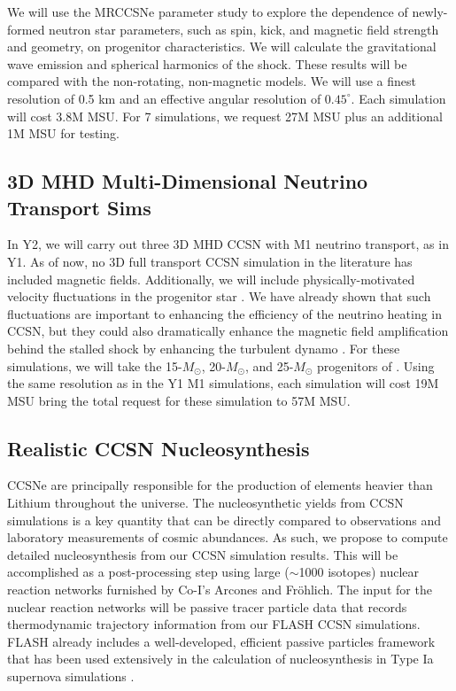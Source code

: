 We will use the MRCCSNe parameter study to explore the dependence of newly-formed neutron star parameters, such as spin, kick, and magnetic field strength and geometry, on progenitor characteristics.
We will calculate the gravitational wave emission and spherical harmonics of the shock.
These results will be compared with the non-rotating, non-magnetic models.
We will use a finest resolution of 0.5 km and an effective angular resolution of $0.45^\circ$.
Each simulation will cost 3.8M MSU.  For 7 simulations, we request 27M MSU plus an additional 1M MSU for testing.

\subsection{3D MHD Multi-Dimensional Neutrino Transport Sims}
\label{sec:enhancedM1}

In Y2, we will carry out three 3D MHD CCSN with M1 neutrino transport, as in Y1.
As of now, no 3D full transport CCSN simulation in the literature has included magnetic fields.
Additionally, we will include physically-motivated velocity fluctuations in the progenitor star \citep{Couch:2013bl, Chatzopoulos:2014uj}.
We have already shown that such fluctuations are important to enhancing the efficiency of the neutrino heating in CCSN, but they could also dramatically enhance the magnetic field amplification behind the stalled shock by enhancing the turbulent dynamo \citep[e.g.][]{Endeve:2012ht}.
For these simulations, we will take the 15-$M_\odot$, 20-$M_\odot$, and 25-$M_\odot$ progenitors of \citet{Heger:2005bi}.
Using the same resolution as in the Y1 M1 simulations, each simulation will cost 19M MSU bring the total request for these simulation to 57M MSU.

\subsection{Realistic CCSN Nucleosynthesis}
\label{sec:nucleo}

CCSNe are principally responsible for the production of elements heavier than Lithium throughout the universe.
The nucleosynthetic yields from CCSN simulations is a key quantity that can be directly compared to observations and laboratory measurements of cosmic abundances.
As such, we propose to compute detailed nucleosynthesis from our CCSN simulation results.
This will be accomplished as a post-processing step using large ($\sim$1000 isotopes) nuclear reaction networks furnished by Co-I's Arcones and Fr\"ohlich.
The input for the nuclear reaction networks will be passive tracer particle data that records thermodynamic trajectory information from our FLASH CCSN simulations.
FLASH already includes a well-developed, efficient passive particles framework that has been used extensively in the calculation of nucleosynthesis in Type Ia supernova simulations \citep[e.g.,][]{Long:2014dv}.


